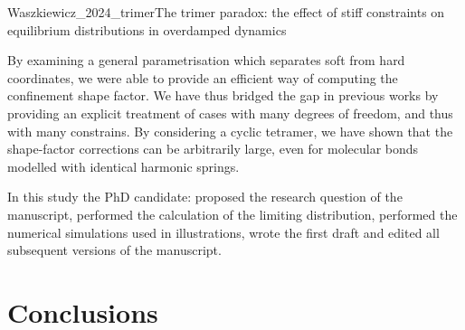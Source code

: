 \documentclass[physics]{doctoral}
\begin{document}
\begin{publicationpage}{Waszkiewicz_2024_trimer}{The trimer paradox: the effect of stiff constraints on equilibrium distributions in overdamped dynamics}
{        %
        By examining a general parametrisation which separates soft from hard coordinates, we were able to provide an efficient way of computing the confinement shape factor.
        We have thus bridged the gap in previous works by providing an explicit treatment of cases with many degrees of freedom, and thus with many constrains.
        By considering a cyclic tetramer, we have shown that the shape-factor corrections can be arbitrarily large, even for molecular bonds modelled with identical harmonic springs.

        In this study the PhD candidate: proposed the research question of the manuscript, performed the calculation of the limiting distribution, performed the numerical simulations used in illustrations, wrote the first draft and edited all subsequent versions of the manuscript.
    }
\end{publicationpage}


\chapter{Conclusions}
\end{document}
